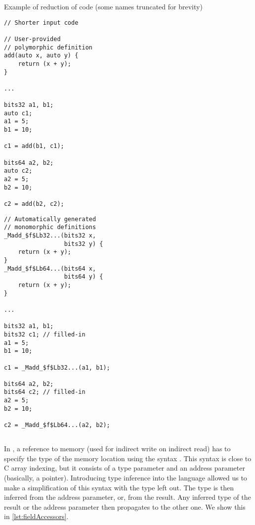 \begin{listing}
    \caption{Example of reduction of code (some names truncated for brevity)}
    \label{lst:reduction}
    \begin{center}
    \begin{minipage}{0.5\linewidth}
    \begin{lstlisting}
// Shorter input code

// User-provided
// polymorphic definition
add(auto x, auto y) {
    return (x + y);
}

...

bits32 a1, b1;
auto c1;
a1 = 5;
b1 = 10;

c1 = add(b1, c1);

bits64 a2, b2;
auto c2;
a2 = 5;
b2 = 10;

c2 = add(b2, c2);
    \end{lstlisting}
    \end{minipage}%
    \begin{minipage}{0.5\linewidth}
    \begin{lstlisting}
// Automatically generated
// monomorphic definitions
_Madd_$f$Lb32...(bits32 x,
                 bits32 y) {
    return (x + y);
}
_Madd_$f$Lb64...(bits64 x,
                 bits64 y) {
    return (x + y);
}

...

bits32 a1, b1;
bits32 c1; // filled-in
a1 = 5;
b1 = 10;

c1 = _Madd_$f$Lb32...(a1, b1);

bits64 a2, b2;
bits64 c2; // filled-in
a2 = 5;
b2 = 10;

c2 = _Madd_$f$Lb64...(a2, b2);
    \end{lstlisting}
    \end{minipage}
    \end{center}
\end{listing}

\subsection{}

In \cmm, a reference to memory (used for indirect write on indirect read) has to specify the type of the memory location using the syntax . This syntax is close to C array indexing, but it consists of a type parameter and an address parameter (basically, a pointer). Introducing type inference into the language allowed us to make a simplification of this syntax with the type left out. The type is then inferred from the address parameter, or, from the result. Any inferred type of the result or the address parameter then propagates to the other one. We show this in \cref{lst:fieldAccessors}.


